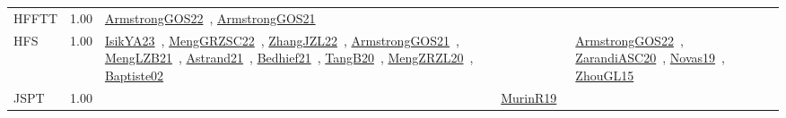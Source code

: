 {\begin{longtable}{p{3cm}r>{\raggedright\arraybackslash}p{6cm}>{\raggedright\arraybackslash}p{6cm}>{\raggedright\arraybackslash}p{8cm}}
\index{HFFTT}\index{Classification!HFFTT}HFFTT &  1.00 & \href{../works/ArmstrongGOS22.pdf}{ArmstrongGOS22}~\cite{ArmstrongGOS22}, \href{../works/ArmstrongGOS21.pdf}{ArmstrongGOS21}~\cite{ArmstrongGOS21} &  & \\
\index{HFS}\index{Classification!HFS}HFS &  1.00 & \href{../works/IsikYA23.pdf}{IsikYA23}~\cite{IsikYA23}, \href{../works/MengGRZSC22.pdf}{MengGRZSC22}~\cite{MengGRZSC22}, \href{../works/ZhangJZL22.pdf}{ZhangJZL22}~\cite{ZhangJZL22}, \href{../works/ArmstrongGOS21.pdf}{ArmstrongGOS21}~\cite{ArmstrongGOS21}, \href{../works/MengLZB21.pdf}{MengLZB21}~\cite{MengLZB21}, \href{../works/Astrand21.pdf}{Astrand21}~\cite{Astrand21}, \href{../works/Bedhief21.pdf}{Bedhief21}~\cite{Bedhief21}, \href{../works/TangB20.pdf}{TangB20}~\cite{TangB20}, \href{../works/MengZRZL20.pdf}{MengZRZL20}~\cite{MengZRZL20}, \href{../works/Baptiste02.pdf}{Baptiste02}~\cite{Baptiste02} &  & \href{../works/ArmstrongGOS22.pdf}{ArmstrongGOS22}~\cite{ArmstrongGOS22}, \href{../works/ZarandiASC20.pdf}{ZarandiASC20}~\cite{ZarandiASC20}, \href{../works/Novas19.pdf}{Novas19}~\cite{Novas19}, \href{../works/ZhouGL15.pdf}{ZhouGL15}~\cite{ZhouGL15}\\
\index{JSPT}\index{Classification!JSPT}JSPT &  1.00 &  & \href{../works/MurinR19.pdf}{MurinR19}~\cite{MurinR19} & \\

\end{longtable}}
